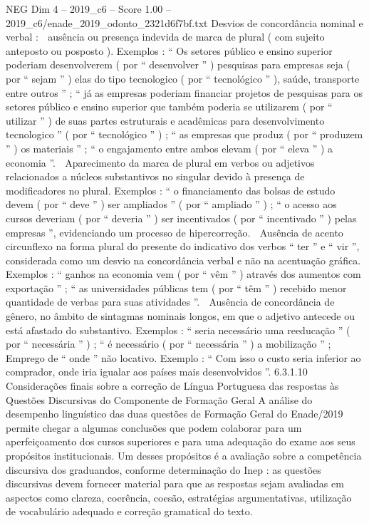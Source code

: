 \begin{textsample}{NEG Dim 4 – 2019\_c6 – Score 1.00 – 2019\_c6/enade\_2019\_odonto\_2321d6f7bf.txt}
Desvios de concordância nominal e verbal :  ausência ou presença indevida de marca de plural ( com sujeito anteposto ou posposto ).
Exemplos : “ Os setores público e ensino superior poderiam desenvolverem ( por “ desenvolver ” ) pesquisas para empresas seja ( por “ sejam ” ) elas do tipo tecnologico ( por “ tecnológico ” ), saúde, transporte entre outros ” ; “ já as empresas poderiam financiar projetos de pesquisas para os setores público e ensino superior que também poderia se utilizarem ( por “ utilizar ” ) de suas partes estruturais e acadêmicas para desenvolvimento tecnologico ” ( por “ tecnológico ” ) ; “ as empresas que produz ( por “ produzem ” ) os materiais ” ; “ o engajamento entre ambos elevam ( por “ eleva ” ) a economia ”.  Aparecimento da marca de plural em verbos ou adjetivos relacionados a núcleos substantivos no singular devido à presença de modificadores no plural.
Exemplos : “ o financiamento das bolsas de estudo devem ( por “ deve ” ) ser ampliados ” ( por “ ampliado ” ) ; “ o acesso aos cursos deveriam ( por “ deveria ” ) ser incentivados ( por “ incentivado ” ) pelas empresas ”, evidenciando um processo de hipercorreção.  Ausência de acento circunflexo na forma plural do presente do indicativo dos verbos “ ter ” e “ vir ”, considerada como um desvio na concordância verbal e não na acentuação gráfica.
Exemplos : “ ganhos na economia vem ( por “ vêm ” ) através dos aumentos com exportação ” ; “ as universidades públicas tem ( por “ têm ” ) recebido menor quantidade de verbas para suas atividades ”.  Ausência de concordância de gênero, no âmbito de sintagmas nominais longos, em que o adjetivo antecede ou está afastado do substantivo.
Exemplos : “ seria necessário uma reeducação ” ( por “ necessária ” ) ; “ é necessário ( por “ necessária ” ) a mobilização ” ;  Emprego de “ onde ” não locativo.
Exemplo : “ Com isso o custo seria inferior ao comprador, onde iria igualar aos países mais desenvolvidos ”. 6.3.1.10 Considerações finais sobre a correção de Língua Portuguesa das respostas às Questões Discursivas do Componente de Formação Geral A análise do desempenho linguístico das duas questões de Formação Geral do Enade/2019 permite chegar a algumas conclusões que podem colaborar para um aperfeiçoamento dos cursos superiores e para uma adequação do exame aos seus propósitos institucionais.
Um desses propósitos é a avaliação sobre a competência discursiva dos graduandos, conforme determinação do Inep : as questões discursivas devem fornecer material para que as respostas sejam avaliadas em aspectos como clareza, coerência, coesão, estratégias argumentativas, utilização de vocabulário adequado e correção gramatical do texto.

\end{textsample}
